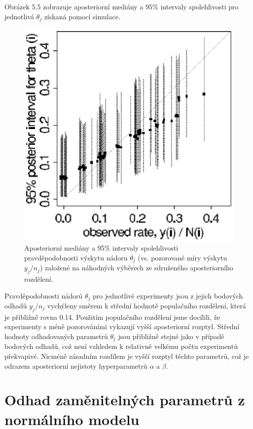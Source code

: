 Obrázek 5.5 zobrazuje aposteriorní mediány a 95\% intervaly spolehlivosti pro jednotlivá $\theta_j$ získaná pomocí simulace.
\begin{figure}[htp]
\centering
\includegraphics[scale = 0.45]{pictures/fig_5_4.eps}
\caption{Aposteriorní mediány a 95\% intervaly spolehlivosti pravděpodobnosti výskytu nádoru $\theta_j$ (vs. pozorované míry výskytu $y_j / n_j$) založené na náhodných výběrech ze sdruženého aposteriorního rozdělení.}
\label{fig_5_4}
\end{figure}
Pravděpodobnosti nádorů $\theta_j$ pro jednotlivé experimenty jsou z jejich bodových odhadů $y_j / n_j$ vychýleny směrem k střední hodnotě populačního rozdělení, která je přibližně rovna 0.14. Použitím populačního rozdělení jsme docílili, že experimenty s méně pozorováními vykazují vyšší aposteriorní rozptyl. Střední hodnoty odhadovaných parametrů $\theta_j$ jsou přibližně stejné jako v případě bodových odhadů, což není vzhledem k relativně velkému počtu experimentů překvapivé. Nicméně zásadním rozdílem je vyšší rozptyl těchto parametrů, což je odrazem aposteriorní nejistoty hyperparametrů $\alpha$ a $\beta$.

\section{Odhad zaměnitelných parametrů z normálního modelu}

